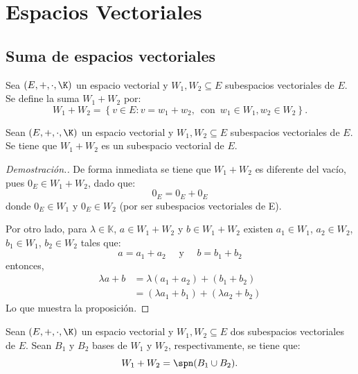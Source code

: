 \documentclass[compacto,10pt]{pubciencias-notas}
\begin{document}
\encabezado

\vspace*{-4mm}

\setcounter{section}{3}
\section{Espacios Vectoriales}
\setcounter{subsection}{7}
\subsection{Suma de espacios vectoriales}

\begin{defi}
    Sea $(E,+,\cdot,\K)$ un espacio vectorial y $W_1,W_2\subseteq E$ subespacios vectoriales de $E$. Se define la suma $W_1+W_2$ por:
    \[
        W_1 + W_2 =\left\{v\in E: v=w_1+w_2, \, \text{ con }\, w_1\in W_1, w_2\in W_2\right\}. 
    \]
\end{defi}
\begin{prop}
    Sean $(E,+,\cdot,\K)$ un espacio vectorial y $W_1,W_2\subseteq E$ subespacios vectoriales de $E$. Se tiene que $W_1 + W_2$ es un subespacio vectorial de $E$.
\end{prop}

\begin{proof}[Demostración.]\hspace{0pt} De forma inmediata se tiene que $W_1+W_2$ es diferente del vacío, pues $0_E\in W_1+W_2$, dado que:
\[0_E = 0_E + 0_E\]
donde $0_E\in W_1$ y $0_E\in W_2$ (por ser subespacios vectoriales de E).\newline

Por otro lado, para $\lambda\in\mathbb{K}$, $a\in W_1+W_2$ y $b\in W_1+W_2$ existen $a_1\in W_1$, $a_2\in W_2$, $b_1\in W_1$, $b_2\in W_2$ tales que:
\[
a = a_1 + a_2\quad \text{ y }\quad b = b_1 + b_2
\]
entonces,
\begin{align*}
    \lambda a + b &= \lambda(a_1+a_2) + (b_1+b_2)\\
                  &= (\lambda a_1 + b_1) + (\lambda a_2 + b_2)
\end{align*}    
Lo que muestra la proposición.
\end{proof}


\begin{prop}
    Sean $(E,+,\cdot,\K)$ un espacio vectorial y $W_1,W_2\subseteq E$ dos subespacios vectoriales de $E$. Sean $B_1$ y $B_2$ bases de $W_1$ y $W_2$, respectivamente, se tiene que:
    \[
        W_1 + W_2 = \spn(B_1 \cup B_2).
    \]
\end{prop}
\end{document}
